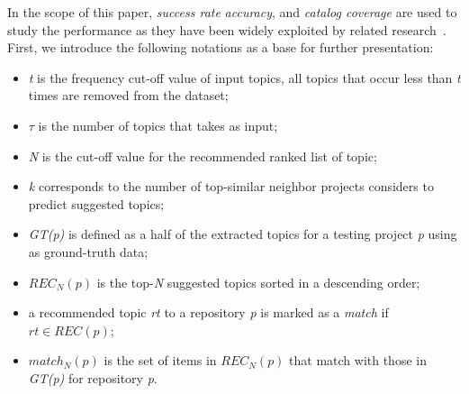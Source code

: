 In the scope of this paper, \emph{success rate} \emph{accuracy}, and 
\emph{catalog coverage} are used to study the \TF performance as they have 
been widely exploited by related research~\cite{Robillard:2014:RSS:2631387}. 
First, we introduce the following notations as a base for further presentation:%
\begin{itemize}[noitemsep,topsep=0pt]
	\item \emph{t} is the frequency cut-off value of input topics, \ie all topics that occur less than \emph{t} times are removed from the dataset;
	\item $\tau$ is the number of topics that \TF takes as input;
	\item \emph{N} is the cut-off value for the recommended ranked list of topic;%
	\item \emph{k} corresponds to the number of top-similar neighbor projects \TF considers to predict suggested topics;
	\item \emph{GT(p)} is defined as a half of the extracted topics for a testing project \emph{p} using as ground-truth data;%
	\item $REC_{N}(p)$ is the top-\emph{N}  suggested topics sorted in a descending order;%
	\item a recommended topic \emph{rt} to a repository \emph{p} is marked as a \emph{match} if $rt \in REC(p)$;
	\item  $match_{N}(p)$ is the set of items in $REC_{N}(p)$ that match with those in \emph{GT(p)} for repository \emph{p}.
\end{itemize}


